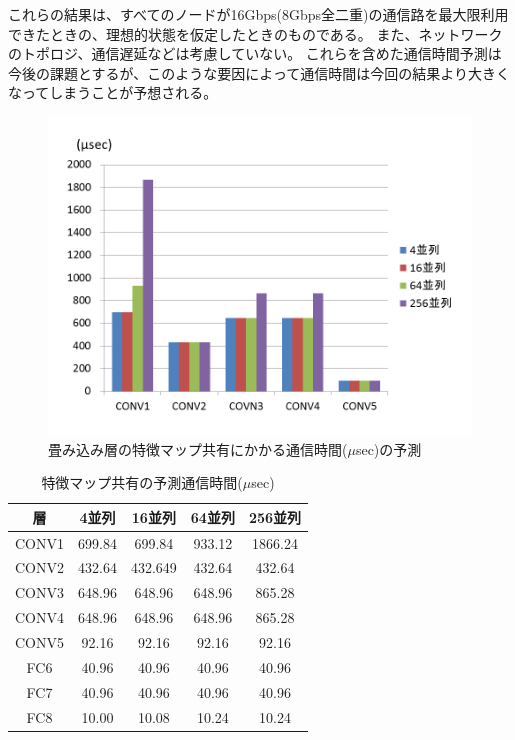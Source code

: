 これらの結果は、すべてのノードが16Gbps(8Gbps全二重)の通信路を最大限利用できたときの、理想的状態を仮定したときのものである。
また、ネットワークのトポロジ、通信遅延などは考慮していない。
これらを含めた通信時間予測は今後の課題とするが、このような要因によって通信時間は今回の結果より大きくなってしまうことが予想される。

\begin{figure}[ht]  
 \begin{center}   
	\includegraphics[width=1.0\columnwidth,bb=0 0 720 540]{img/broadcast_time.png}
  \caption{畳み込み層の特徴マップ共有にかかる通信時間($\mu$sec)の予測}
  \label{gra_broadcast_time}  
 \end{center}  
\end{figure}

\begin{table}[ht]
 \begin{center}
  \caption{特徴マップ共有の予測通信時間($\mu$sec)}
   \begin{tabular}{|c|c|c|c|c|} \hline
     層 & 4並列 & 16並列 & 64並列 & 256並列 \\ \hline
     CONV1 & 699.84 & 699.84 & 933.12 & 1866.24 \\
     CONV2 & 432.64 & 432.649 & 432.64 & 432.64 \\
     CONV3 & 648.96 & 648.96 & 648.96 & 865.28 \\
     CONV4 & 648.96 & 648.96 & 648.96 & 865.28 \\
     CONV5 & 92.16 & 92.16 & 92.16 & 92.16 \\
     FC6 & 40.96 & 40.96 & 40.96 & 40.96\\
     FC7 & 40.96 & 40.96 & 40.96 & 40.96\\
     FC8 & 10.00 & 10.08 & 10.24 & 10.24\\ \hline
  \end{tabular}
  \label{tdmtime}  
 \end{center}
\end{table}

